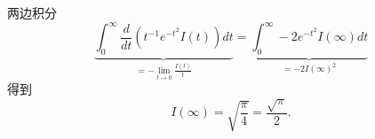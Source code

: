 \begin{itemize}
两边积分
$$
\underbrace{\int_0^{\infty} \frac{d}{d t}\left(t^{-1} e^{-t^2} I(t)\right) d t}_{=-\lim _{t \rightarrow 0} \frac{I(t)}{t}}=\underbrace{\int_0^{\infty}-2 e^{-t^2} I(\infty) d t}_{=-2 I(\infty)^2}
$$
得到
$$
I(\infty) = \sqrt{\frac{\pi}{4}} = \frac{\sqrt{\pi}}{2}.
$$

\end{itemize}